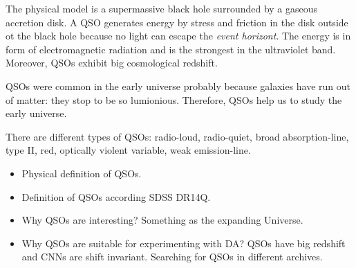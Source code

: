 The physical model is a supermassive black hole surrounded by a gaseous accretion disk.
A QSO generates energy by stress and friction in the disk outside ot the black hole because no light can escape the \textit{event horizont}.
The energy is in form of electromagnetic radiation and is the strongest in the ultraviolet band.
Moreover, QSOs exhibit big cosmological redshift.

QSOs were common in the early universe probably because galaxies have run out of matter: they stop to be so lumionious.
Therefore, QSOs help us to study the early universe.

There are different types of QSOs: radio-loud, radio-quiet, broad absorption-line, type II, red, optically violent variable, weak emission-line.

\begin{itemize}
	\item Physical definition of QSOs.
	\item Definition of QSOs according SDSS DR14Q.
	\item Why QSOs are interesting? Something as the expanding Universe.
	\item Why QSOs are suitable for experimenting with DA?
		QSOs have big redshift and CNNs are shift invariant.
		Searching for QSOs in different archives.
\end{itemize}


